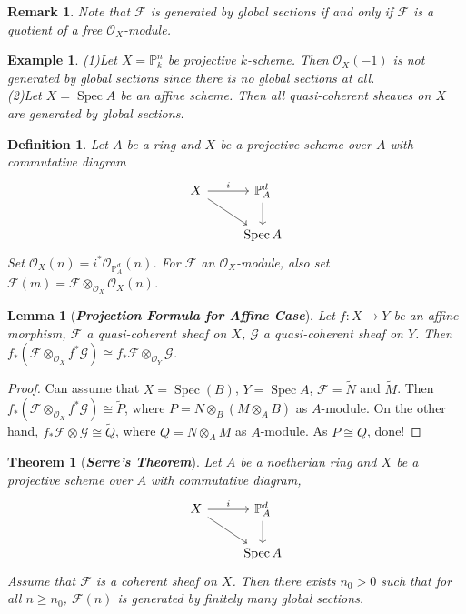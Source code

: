 \documentclass{ctexart}
\newtheorem{definition}{Definition}[section]
\newtheorem{remark}{Remark}[section]
\newtheorem{theorem}{Theorem}[section]
\newtheorem{lemma}{Lemma}[section]
\newtheorem{example}{Example}[section]
\newcommand{\spec}{\operatorname{Spec}}
\begin{document}
\begin{remark}
    Note that $\mathcal{F}$ is generated by global sections if and only if $\mathcal{F}$ is a quotient of a free $\mathcal{O}_{X}$-module.
\end{remark}
\begin{example}
    (1)Let $X = \mathbb{P}_{k}^{n}$ be projective $k$-scheme.
    Then $\mathcal{O}_{X}(-1)$ is not generated by global sections since there is no global sections at all. \\
    (2)Let $X = \spec A$ be an affine scheme.
    Then all quasi-coherent sheaves on $X$ are generated by global sections.
\end{example}
\begin{definition}
    Let $A$ be a ring and $X$ be a projective scheme over $A$ with commutative diagram
    \begin{equation*}
        \begin{tikzcd}
            X \arrow[r, "i"] \arrow[dr] &
            \mathbb{P}_{A}^{d} \arrow[d] \\
            & \spec A
        \end{tikzcd}
    \end{equation*}
    Set $\mathcal{O}_{X}(n) = i^{\ast}\mathcal{O}_{\mathbb{P}_{A}^{d}}(n)$.
    For $\mathcal{F}$ an $\mathcal{O}_{X}$-module, also set $\mathcal{F}(m) = \mathcal{F} \otimes_{\mathcal{O}_{X}} \mathcal{O}_{X}(n)$.
\end{definition}
\begin{lemma}[\textbf{\emph{Projection Formula for Affine Case}}]
    Let $f: X \longrightarrow Y$ be an affine morphism, $\mathcal{F}$ a quasi-coherent sheaf on $X$, $\mathcal{G}$ a quasi-coherent sheaf on $Y$.
    Then $f_{\ast}(\mathcal{F} \otimes_{\mathcal{O}_{X}} f^{\ast}\mathcal{G}) \cong f_{\ast}\mathcal{F} \otimes_{\mathcal{O}_{Y}} \mathcal{G}$.
    \label{Lemma 6.4}
\end{lemma}
\begin{proof}
    Can assume that $X = \spec(B)$, $Y = \spec A$, $\mathcal{F} = \widetilde{N}$ and $\widetilde{M}$.
    Then $f_{\ast}(\mathcal{F} \otimes_{\mathcal{O}_{X}} f^{\ast}\mathcal{G}) \cong \widetilde{P}$,
    where $P = N \otimes_{B} (M \otimes_{A} B)$ as $A$-module.
    On the other hand, $f_{\ast}\mathcal{F} \otimes \mathcal{G} \cong \widetilde{Q}$,
    where $Q = N \otimes_{A} M$ as $A$-module.
    As $P \cong Q$, done!
\end{proof}
\begin{theorem}[\textbf{\emph{Serre's Theorem}}]
    Let $A$ be a noetherian ring and $X$ be a projective scheme over $A$ with commutative diagram, 
    \begin{equation*}
        \begin{tikzcd}
            X \arrow[r, "i"] \arrow[dr] &
            \mathbb{P}_{A}^{d} \arrow[d] \\
            & \spec A
        \end{tikzcd}
    \end{equation*}
    Assume that $\mathcal{F}$ is a coherent sheaf on $X$.
    Then there exists $n_{0} > 0$ such that for all $n \ge n_{0}$, $\mathcal{F}(n)$ is generated by finitely many global sections.
    \label{Theorem 6.3}
\end{theorem}
\end{document}
